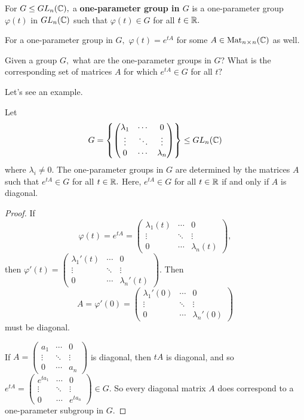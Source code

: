 \begin{definition}
For $G \leq GL_n(\mathbb C),$ a \textbf{one-parameter group in $G$} is a one-parameter group $\varphi(t)$ in $GL_n(\mathbb C)$ such that $\varphi(t) \in G$ for all $t \in \mathbb R.$ 
\end{definition}

For a one-parameter group in $G,$ $\varphi(t) = e^{tA}$ for some $A \in \text{Mat}_{n \hspace{0.05em}{\times}\hspace{0.05em} n}(\mathbb C)$ as well. 

\begin{qq}
Given a group $G,$ what are the one-parameter groups in $G$? What is the corresponding set of matrices $A$ for which $e^{tA} \in G$ for all $t?$ 
\end{qq}

Let's see an example.

\begin{example}
Let \[G = \left\{\begin{pmatrix} \lambda_1 & \cdots & 0 \\ \vdots & \ddots & \vdots \\ 0 & \cdots & \lambda_n \end{pmatrix} \right\} \leq GL_n(\mathbb C)\] where $\lambda_i \neq 0.$ The one-parameter groups in $G$ are determined by the matrices $A$ such that $e^{tA} \in G$ for all $t \in \mathbb R.$ Here, $e^{tA} \in G$ for all $t \in \mathbb R$ if and only if $A$ is diagonal.
\end{example}

\begin{proof}
If \[\varphi(t) = e^{tA} = \begin{pmatrix} \lambda_1(t) & \cdots & 0 \\ \vdots & \ddots & \vdots \\ 0 & \cdots & \lambda_n(t) \end{pmatrix},\] then $\varphi'(t) = \begin{pmatrix} \lambda_1'(t) & \cdots & 0 \\ \vdots & \ddots & \vdots \\ 0 & \cdots & \lambda_n'(t) \end{pmatrix}$. Then \[A = \varphi'(0) = \begin{pmatrix} \lambda_1'(0) & \cdots & 0 \\ \vdots & \ddots & \vdots \\ 0 & \cdots & \lambda_n'(0) \end{pmatrix}\] must be diagonal. 

If $A = \begin{pmatrix} a_1 & \cdots & 0 \\ \vdots & \ddots & \vdots \\ 0 & \cdots & a_n \end{pmatrix}$ is diagonal, then $tA$ is diagonal, and so $e^{tA} = \begin{pmatrix} e^{ta_1} & \cdots & 0 \\ \vdots & \ddots & \vdots \\ 0 & \cdots & e^{ta_n} \end{pmatrix} \in G.$ So every diagonal matrix $A$ does correspond to a one-parameter subgroup in $G.$
\end{proof}


